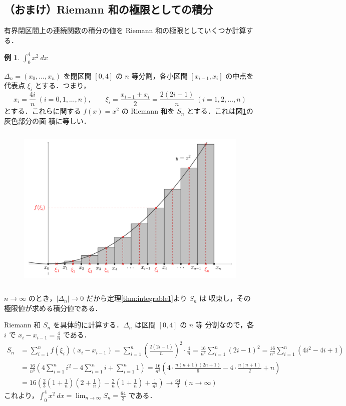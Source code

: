 \documentclass[10pt, uplatex, dvipdfmx]{jsarticle}
\theoremstyle{definition}
\newtheorem{example}[theorem]{例}
\numberwithin{equation}{section}
\newcommand{\ds}{\displaystyle}
\begin{document}
\subsection{（おまけ）Riemann 和の極限としての積分}\label{sec:Rsum_computation}
有界閉区間上の連続関数の積分の値を Riemann 和の極限としていくつか計算する．

\begin{example}
$\ds \int_{0}^{4} x^2 \ dx$ 

  \vspace{1zh}

  $\Delta_n=(x_0, \ldots, x_n)$ を閉区間 $[0,4]$ の $n$ 等分割，各小区間 $[x_{i-1}, x_i]$
  の中点を代表点 $\xi_i$ とする．つまり，
  \[
    x_i = \frac{4i}{n} \; (i=0,1, \ldots, n) , \qquad \xi_i =
    \frac{x_{i-1} + x_{i}}{2} = \frac{2(2i-1)}{n} \; (i=1,2, \ldots, n)
  \]
  とする．これらに関する $f(x) =
  x^2$ の Riemann 和を $S_n$ とする．これは図\ref{fig:Rsum_quadratic}の灰色部分の面
  積に等しい．
  \begin{figure}[h]
    \centering
    \includegraphics[height=8cm]{./pictures/02/quadratic.pdf}
    \caption{}\label{fig:Rsum_quadratic}
  \end{figure}
  $n \to \infty$ のとき，$|\Delta_n| \to 0$ だから定理\ref{thm:integrable1}より $S_n$ は
  収束し，その極限値が求める積分値である．

  Riemann 和 $\ds S_n $ を具体的に計算する．$\Delta_n$ は区間 $[0,4]$ の $n$ 等
  分割なので，各 $i$ で $\ds x_{i} - x_{i-1} = \frac{4}{n}$ である．
  \[
    \begin{aligned}
      S_n &= \sum_{i=1}^{n} f(\xi_i)(x_i - x_{i-1})
            = \sum_{i=1}^{n} \left( \frac{2(2i-1)}{n}\right)^2 \cdot \frac{4}{n}
            =\frac{16}{n^3}\sum_{i=1}^{n} (2i-1)^2
            = \frac{16}{n^3} \sum_{i=1}^{n} \left(4i^2-4i+1\right)\\[2ex]
          &  = \frac{16}{n^3} \left( 4 \sum_{i=1}^{n} i^2 - 4 \sum_{i=1}^{n} i + \sum_{i=1}^{n} 1\right)
            = \frac{16}{n^3} \left( 4 \cdot \frac{n(n+1)(2n+1)}{6} - 4 \cdot \frac{n(n+1)}{2} + n\right)\\[2ex]
          &= 16 \left( \frac{2}{3} \left( 1 + \frac{1}{n}\right)\left(2+\frac{1}{n}\right)
            - \frac{2}{n} \left(1+\frac{1}{n}\right) + \frac{1}{n^2}\right) \to \frac{64}{3} \; (n \to \infty)
    \end{aligned}
  \]
  これより，$\ds \int_{0}^{4}x^2 \ dx = \lim_{n \to \infty} S_n = \frac{64}{3}$ である．
\end{example}
\end{document}
